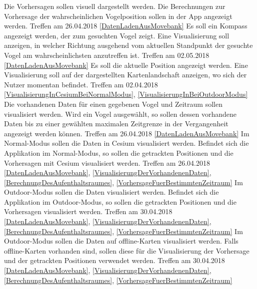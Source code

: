\documentclass[12pt]{article} %
\begin{document}
\begin{requirements}[ref={(R\arabic*)},label=(R\arabic*),resume]
{
 Die Vorhersagen sollen visuell dargestellt werden. 
 }{
 Die Berechnungen zur Vorhersage der wahrscheinlichen Vogelposition sollen in der App angezeigt werden. 
 }{
 Treffen am 26.04.2018 
 }{
 \ref{DatenLadenAusMovebank} 
}
{
 Es soll ein Kompass angezeigt werden, der zum gesuchten Vogel zeigt. 
 }{
 Eine Visualisierung soll anzeigen, in welcher Richtung ausgehend vom aktuellen Standpunkt der gesuchte Vogel am wahrscheinlichsten anzutreffen ist. 
 }{
 Treffen am 02.05.2018 
 }{
 \ref{DatenLadenAusMovebank} 
}
{
 Es soll die aktuelle Position angezeigt werden. 
 }{
 Eine Visualisierung soll auf der dargestellten Kartenlandschaft anzeigen, wo sich der Nutzer momentan befindet.
 }{
 Treffen am 02.04.2018 
 }{
 \ref{VisualisierungInCesiumBeiNormalModus}, \ref{VisualisierungInBeiOutdoorModus} 
}
{
 Die vorhandenen Daten für einen gegebenen Vogel und Zeitraum sollen visualisiert werden. 
 }{
 Wird ein Vogel ausgewählt, so sollen dessen vorhandene Daten bis zu einer gewählten maximalen Zeitgrenze in der Vergangenheit angezeigt werden können.
 }{
 Treffen am 26.04.2018 
 }{
 \ref{DatenLadenAusMovebank} 
}
{
 Im Normal-Modus sollen die Daten in Cesium visualisiert werden.
 }{
 Befindet sich die Applikation im Normal-Modus, so sollen die getrackten Positionen und die Vorhersagen mit Cesium visualisiert werden.
 }{
 Treffen am 26.04.2018
 }{
 \ref{DatenLadenAusMovebank}, \ref{VisualisierungDerVorhandenenDaten}, \ref{BerechnungDesAufenthaltsraumes}, \ref{VorhersageFuerBestimmtenZeitraum}
}
{
 Im Outdoor-Modus sollen die Daten visualisiert werden.
 }{
 Befindet sich die Applikation im Outdoor-Modus, so sollen die getrackten Positionen und die Vorhersagen visualisiert werden.
 }{
 Treffen am 30.04.2018
 }{
 \ref{DatenLadenAusMovebank}, \ref{VisualisierungDerVorhandenenDaten}, \ref{BerechnungDesAufenthaltsraumes}, \ref{VorhersageFuerBestimmtenZeitraum}
}
{
 Im Outdoor-Modus sollen die Daten auf offline-Karten visualisiert werden.
 }{
 Falls offline-Karten vorhanden sind, sollen diese für die Visualisierung der Vorhersage und der getrackten Positionen verwendet werden. 
 }{
 Treffen am 30.04.2018
 }{
 \ref{DatenLadenAusMovebank}, \ref{VisualisierungDerVorhandenenDaten}, \ref{BerechnungDesAufenthaltsraumes}, \ref{VorhersageFuerBestimmtenZeitraum}
}
\end{requirements}
\end{document}
